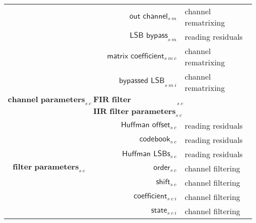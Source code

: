 \begin{landscape}
{\begin{tabular}{rrl}
& $\textsf{out channel}_{s~m}$
& channel rematrixing \\
& $\textsf{LSB bypass}_{s~m}$
& reading residuals \\
& $\textsf{matrix coefficient}_{s~m~c}$
& channel rematrixing \\
& $\textsf{bypassed LSB}_{s~m~i}$
& channel rematrixing \\
\hline
\hyperref[mlp:readchannelparams]{$\textbf{channel parameters}_{s~c}$}
& \hyperref[mlp:readfirfilterparams]{$\textbf{FIR filter parameters}_{s~c}$} \\
& \hyperref[mlp:readiirfilterparams]{$\textbf{IIR filter parameters}_{s~c}$} \\
& $\textsf{Huffman offset}_{s~c}$
& reading residuals \\
& $\textsf{codebook}_{s~c}$
& reading residuals \\
& $\textsf{Huffman LSBs}_{s~c}$
& reading residuals \\
\hline
$\textbf{filter parameters}_{s~c}$
& $\textsf{order}_{s~c}$
& channel filtering \\
& $\textsf{shift}_{s~c}$
& channel filtering \\
& $\textsf{coefficient}_{s~c~i}$
& channel filtering \\
& $\textsf{state}_{s~c~i}$
& channel filtering \\
\end{tabular}
}


\end{landscape}

